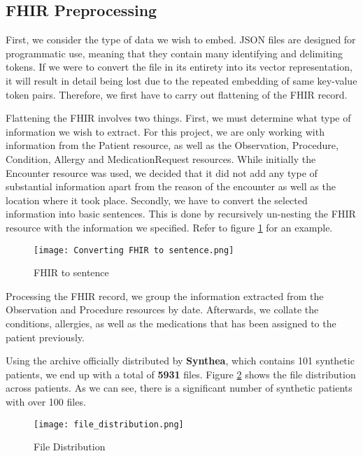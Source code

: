 \subsection{FHIR Preprocessing}

First, we consider the type of data we wish to embed. JSON files are designed for programmatic use, meaning that they contain many identifying and delimiting tokens. If we were to convert the file in its entirety into its vector representation, it will result in detail being lost due to the repeated embedding of same key-value token pairs. Therefore, we first have to carry out flattening of the FHIR record.

Flattening the FHIR involves two things. First, we must determine what type of information we wish to extract. For this project, we are only working with information from the Patient resource, as well as the Observation, Procedure, Condition, Allergy and MedicationRequest resources. While initially the Encounter resource was used, we decided that it did not add any type of substantial information apart from the reason of the encounter as well as the location where it took place. Secondly, we have to convert the selected information into basic sentences. This is done by recursively un-nesting the FHIR resource with the information we specified. Refer to figure \ref{fig:FHIRtoSentence} for an example.

\begin{figure}
	\texttt{[image: Converting FHIR to sentence.png]}
	\caption{FHIR to sentence}
	\centering
	\label{fig:FHIRtoSentence}
\end{figure}

Processing the FHIR record, we group the information extracted from the Observation and Procedure resources by date. Afterwards, we collate the conditions, allergies, as well as the medications that has been assigned to the patient previously.

Using the archive officially distributed by \textbf{Synthea}, which contains 101 synthetic patients, we end up with a total of \textbf{5931} files. Figure \ref{fig:FileDistribution} shows the file distribution across patients. As we can see, there is a significant number of synthetic patients with over 100 files.

\begin{figure}[h]
	\centering
	\texttt{[image: file\_distribution.png]}
	\caption{File Distribution}
	\label{fig:FileDistribution}
\end{figure}

